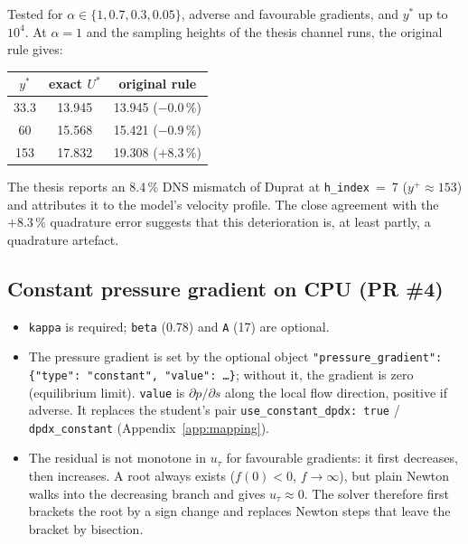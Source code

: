 \documentclass[11pt,a4paper]{article}
\newcommand{\code}[1]{\texttt{#1}}
\newcommand{\utau}{u_\tau}
\newcommand{\dpds}{\partial p/\partial s}
\begin{document}
\noindent Tested for $\alpha\in\{1, 0.7, 0.3, 0.05\}$, adverse and
favourable gradients, and $y^*$ up to $10^4$. At $\alpha = 1$ and the
sampling heights of the thesis channel runs, the original rule gives:

\begin{center}
\small
\begin{tabular}{ccc}
\toprule
$y^*$ & exact $U^*$ & original rule \\
\midrule
33.3 & 13.945 & 13.945 ($-0.0$\,\%) \\
60   & 15.568 & 15.421 ($-0.9$\,\%) \\
153  & 17.832 & 19.308 ($+8.3$\,\%) \\
\bottomrule
\end{tabular}
\end{center}

\noindent The thesis reports an 8.4\,\% DNS mismatch of Duprat at
\code{h\_index}~=~7 ($y^+\approx153$) and attributes it to the model's
velocity profile. The close agreement with the $+8.3$\,\% quadrature error
suggests that this deterioration is, at least partly, a quadrature
artefact.

\subsection{Constant pressure gradient on CPU (PR \#4)}

\begin{itemize}
  \item \code{kappa} is required; \code{beta} (0.78) and \code{A} (17) are
    optional.
  \item The pressure gradient is set by the optional object
    \code{"pressure\_gradient": \{"type": "constant", "value": \ldots\}};
    without it, the gradient is zero (equilibrium limit). \code{value} is
    $\dpds$ along the local flow direction, positive if adverse. It
    replaces the student's pair \code{use\_constant\_dpdx: true} /
    \code{dpdx\_constant} (Appendix~\ref{app:mapping}).
  \item The residual is not monotone in $\utau$ for favourable gradients:
    it first decreases, then increases. A root always exists ($f(0)<0$,
    $f\to\infty$), but plain Newton walks into the decreasing branch and
    gives $\utau\approx0$. The solver therefore first brackets the root by
    a sign change and replaces Newton steps that leave the bracket by
    bisection.
\end{itemize}
\end{document}
